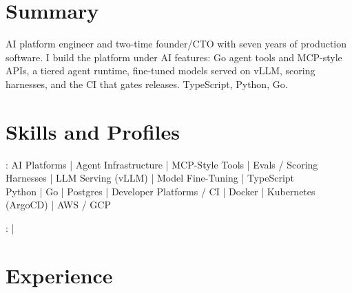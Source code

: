 \documentclass[print]{jack-resume}
\begin{document}
\pagecolor{darkmodeBackground}


\begin{minipage}[t][1cm][t]{.03\textwidth}
    \hfill
\end{minipage}

\section{Summary}
AI platform engineer and two-time founder/CTO with seven years of production software. I build the platform under AI features: Go agent tools and MCP-style APIs, a tiered agent runtime, fine-tuned models served on vLLM, scoring harnesses, and the CI that gates releases. TypeScript, Python, Go.
\sectionsep

\section{Skills and Profiles}
:
AI Platforms \hfill | \hfill
Agent Infrastructure \hfill | \hfill
MCP-Style Tools \hfill | \hfill
Evals / Scoring Harnesses \hfill | \hfill
LLM Serving (vLLM) \hfill | \hfill
Model Fine-Tuning \hfill | \hfill
TypeScript \\
\hspace{1.0cm} Python \hfill | \hfill
Go \hfill | \hfill
Postgres \hfill | \hfill
Developer Platforms / CI \hfill | \hfill
Docker \hfill | \hfill
Kubernetes (ArgoCD) \hfill | \hfill
AWS / GCP \\

\raggedright{
    :
      \href{https://www.linkedin.com/in/jack-sturtevant/}{ \ExternalLink} |
     \href{https://github.com/jacksturt}{ \ExternalLink}}

\section{Experience}
\end{document}
